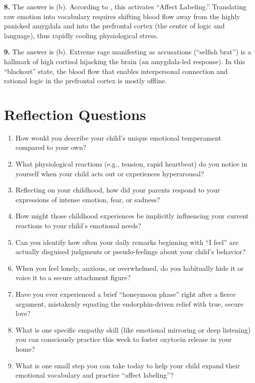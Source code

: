 \begin{practiceexercise}
\textbf{8.} The answer is (b). According to \citet{lieberman2007}, this activates ``Affect Labeling.'' Translating raw emotion into vocabulary requires shifting blood flow away from the highly panicked amygdala and into the prefrontal cortex (the center of logic and language), thus rapidly cooling physiological stress.

\textbf{9.} The answer is (b). Extreme rage manifesting as accusations (``selfish brat'') is a hallmark of high cortisol hijacking the brain (an amygdala-led response). In this ``blackout'' state, the blood flow that enables interpersonal connection and rational logic in the prefrontal cortex is mostly offline.
\vspace{\fill}
\newpage
\end{practiceexercise}
\newpage
\section{Reflection Questions}

\begin{reflection}
\small
\begin{enumerate}[itemsep=0pt, parsep=0pt, topsep=0pt]
  \item How would you describe your child's unique emotional temperament compared to your own?
  \item What physiological reactions (e.g., tension, rapid heartbeat) do you notice in yourself when your child acts out or experiences hyperarousal?
  \item Reflecting on your childhood, how did your parents respond to your expressions of intense emotion, fear, or sadness?
  \item How might those childhood experiences be implicitly influencing your current reactions to your child's emotional needs?
  \item Can you identify how often your daily remarks beginning with ``I feel'' are actually disguised judgments or pseudo-feelings about your child's behavior?
  \item When you feel lonely, anxious, or overwhelmed, do you habitually hide it or voice it to a secure attachment figure?
  \item Have you ever experienced a brief ``honeymoon phase'' right after a fierce argument, mistakenly equating the endorphin-driven relief with true, secure love?
  \item What is one specific empathy skill (like emotional mirroring or deep listening) you can consciously practice this week to foster oxytocin release in your home?
  \item What is one small step you can take today to help your child expand their emotional vocabulary and practice ``affect labeling''?
\end{enumerate}
\end{reflection}
